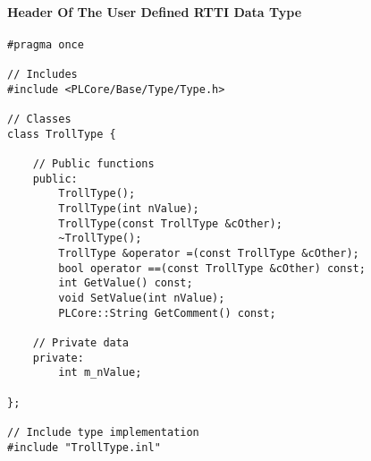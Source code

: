 \paragraph{Header Of The User Defined RTTI Data Type}
\begin{lstlisting}[label=Code:UserDefinedRTTIDataTypeHeader,caption={Header of the user defined RTTI data type}]
#pragma once

// Includes
#include <PLCore/Base/Type/Type.h>

// Classes
class TrollType {

	// Public functions
	public:
		TrollType();
		TrollType(int nValue);
		TrollType(const TrollType &cOther);
		~TrollType();
		TrollType &operator =(const TrollType &cOther);
		bool operator ==(const TrollType &cOther) const;
		int GetValue() const;
		void SetValue(int nValue);
		PLCore::String GetComment() const;

	// Private data
	private:
		int m_nValue;

};

// Include type implementation
#include "TrollType.inl"
\end{lstlisting}


